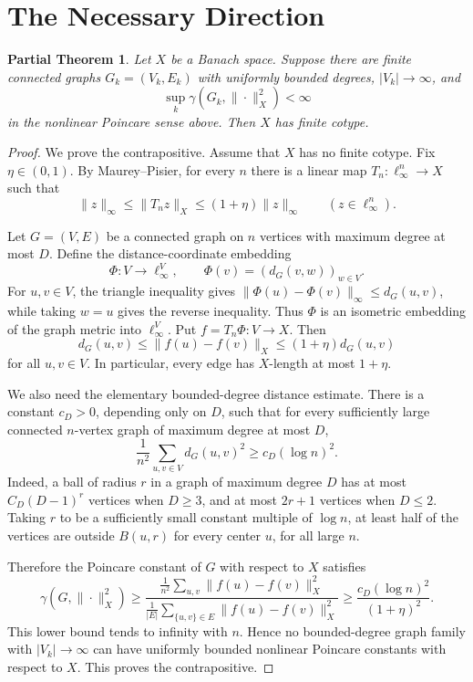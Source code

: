 \documentclass[11pt]{article}
\newtheorem*{theorem}{Partial Theorem}
\begin{document}
\section*{The Necessary Direction}

\begin{theorem}
Let \(X\) be a Banach space. Suppose there are finite connected graphs
\(G_k=(V_k,E_k)\) with uniformly bounded degrees, \(|V_k|\to\infty\), and
\[
\sup_k \gamma(G_k,\|\cdot\|_X^2)<\infty
\]
in the nonlinear Poincare sense above. Then \(X\) has finite cotype.
\end{theorem}

\begin{proof}
We prove the contrapositive. Assume that \(X\) has no finite cotype. Fix
\(\eta\in(0,1)\). By Maurey--Pisier, for every \(n\) there is a linear map
\(T_n:\ell_\infty^n\to X\) such that
\[
\|z\|_\infty\le \|T_n z\|_X\le (1+\eta)\|z\|_\infty
\qquad (z\in\ell_\infty^n).
\]

Let \(G=(V,E)\) be a connected graph on \(n\) vertices with maximum degree at
most \(D\). Define the distance-coordinate embedding
\[
\Phi:V\to \ell_\infty^V,\qquad
\Phi(v)=(d_G(v,w))_{w\in V}.
\]
For \(u,v\in V\), the triangle inequality gives
\(\|\Phi(u)-\Phi(v)\|_\infty\le d_G(u,v)\), while taking \(w=u\) gives the
reverse inequality. Thus \(\Phi\) is an isometric embedding of the graph
metric into \(\ell_\infty^V\). Put \(f=T_n\Phi:V\to X\). Then
\[
d_G(u,v)\le \|f(u)-f(v)\|_X\le (1+\eta)d_G(u,v)
\]
for all \(u,v\in V\). In particular, every edge has \(X\)-length at most
\(1+\eta\).

We also need the elementary bounded-degree distance estimate. There is a
constant \(c_D>0\), depending only on \(D\), such that for every sufficiently
large connected \(n\)-vertex graph of maximum degree at most \(D\),
\[
\frac{1}{n^2}\sum_{u,v\in V}d_G(u,v)^2\ge c_D(\log n)^2.
\]
Indeed, a ball of radius \(r\) in a graph of maximum degree \(D\) has at most
\(C_D(D-1)^r\) vertices when \(D\ge 3\), and at most \(2r+1\) vertices when
\(D\le 2\). Taking \(r\) to be a sufficiently small constant multiple of
\(\log n\), at least half of the vertices are outside \(B(u,r)\) for every
center \(u\), for all large \(n\).

Therefore the Poincare constant of \(G\) with respect to \(X\) satisfies
\[
\gamma(G,\|\cdot\|_X^2)
\ge
\frac{\frac1{n^2}\sum_{u,v}\|f(u)-f(v)\|_X^2}
{\frac1{|E|}\sum_{\{u,v\}\in E}\|f(u)-f(v)\|_X^2}
\ge
\frac{c_D(\log n)^2}{(1+\eta)^2}.
\]
This lower bound tends to infinity with \(n\). Hence no bounded-degree graph
family with \(|V_k|\to\infty\) can have uniformly bounded nonlinear Poincare
constants with respect to \(X\). This proves the contrapositive.
\end{proof}
\end{document}
